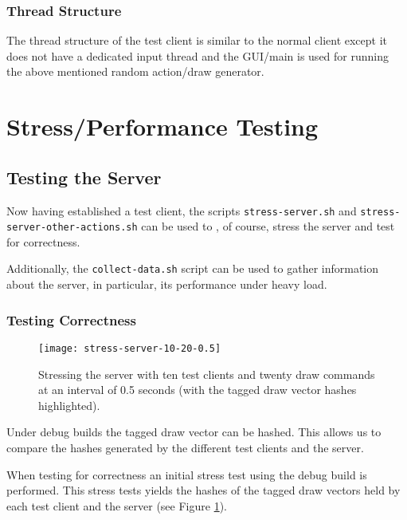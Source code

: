 \documentclass[article]{uom-coursework}
\begin{document}
\subsubsection{Thread Structure}

The thread structure of the test client is similar to the normal
client except it does not have a dedicated input thread and the
GUI/main is used for running the above mentioned random
action/draw generator.

\section{Stress/Performance Testing}\label{sec:stresstesting}

\subsection{Testing the Server}

Now having established a test client, the scripts
\texttt{stress-server.sh} and
\texttt{stress-server-other-actions.sh} can be used to , of
course, stress the server and test for correctness.

Additionally, the \texttt{collect-data.sh} script can be used to
gather information about the server, in particular, its
performance under heavy load.

\subsubsection{Testing Correctness}

\begin{figure}[H]
\centering
\texttt{[image: stress-server-10-20-0.5]}
\caption{Stressing the server with ten test clients and twenty
draw commands at an interval of 0.5 seconds (with the tagged
draw vector hashes highlighted).}
\label{fig:stresstest1}
\end{figure}

\begin{note}
    Under debug builds the tagged draw vector can be hashed.
    This allows us to compare the hashes generated by the
    different test clients and the server.
\end{note}

When testing for correctness an initial stress test using the
debug build is performed. This stress tests yields the hashes of
the tagged draw vectors held by each test client and the server
(see Figure \ref{fig:stresstest1}).
\end{document}
